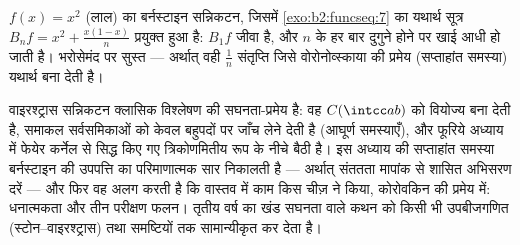 \begin{omfigure}

{\small $f(x) = x^2$ (लाल) का बर्नस्टाइन सन्निकटन, जिसमें \cref{exo:b2:funcseq:7} का यथार्थ सूत्र $B_nf = x^2 + \frac{x(1-x)}{n}$
प्रयुक्त हुआ है: $B_1f$ जीवा है, और $n$ के हर बार दुगुने होने पर खाई आधी हो
जाती है। भरोसेमंद पर सुस्त --- अर्थात् वही $\frac1n$ संतृप्ति जिसे वोरोनोव्स्काया
की प्रमेय (सप्ताहांत समस्या) यथार्थ बना देती है।}
\end{omfigure}

\begin{remark}[यह कहाँ काम आता है]
वाइरश्ट्रास सन्निकटन क्लासिक विश्लेषण की सघनता-प्रमेय है: वह $C(\intcc ab)$ को
वियोज्य बना देती है, समाकल सर्वसमिकाओं को केवल बहुपदों पर जाँच लेने देती
है (आघूर्ण समस्याएँ), और फूरिये अध्याय में फेयेर कर्नेल से सिद्ध किए गए
त्रिकोणमितीय रूप के नीचे बैठी है। इस अध्याय की सप्ताहांत समस्या
बर्नस्टाइन की उपपत्ति का परिमाणात्मक सार निकालती है --- अर्थात् संततता
मापांक से शासित अभिसरण दरें --- और फिर वह अलग करती है कि वास्तव में काम
किस चीज़ ने किया, कोरोवकिन की प्रमेय में: धनात्मकता और तीन परीक्षण फलन।
तृतीय वर्ष का खंड सघनता वाले कथन को किसी भी उपबीजगणित (स्टोन--वाइरश्ट्रास)
तथा  समष्टियों तक सामान्यीकृत कर देता है।
\end{remark}

